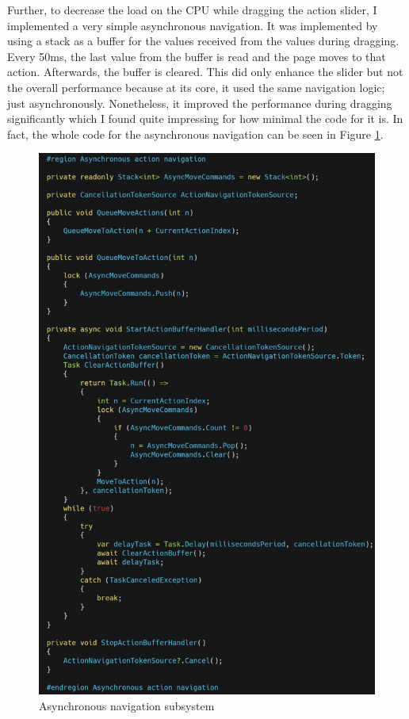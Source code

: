 Further, to decrease the load on the CPU while dragging the action slider, I implemented a very simple asynchronous navigation. It was implemented by using a stack as a buffer for the values received from the values during dragging. Every 50ms, the last value from the buffer is read and the page moves to that action. Afterwards, the buffer is cleared. This did only enhance the slider but not the overall performance because at its core, it used the same navigation logic; just asynchronously. Nonetheless, it improved the performance during dragging significantly which I found quite impressing for how minimal the code for it is. In fact, the whole code for the asynchronous navigation can be seen in Figure \ref{async.navigation}.

\begin{figure}
\caption{Asynchronous navigation subsystem}
\label{async.navigation}
\includegraphics[width=\textwidth]{figures/async-navigation.png}
\end{figure}

